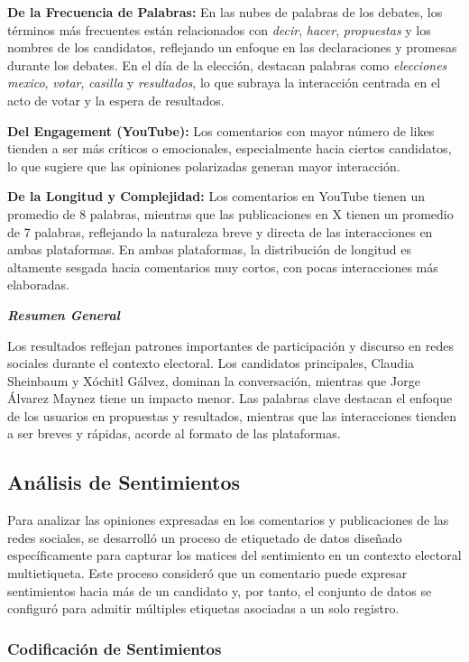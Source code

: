 \documentclass[10pt, a4paper]{article}
\begin{document}
	\textbf{De la Frecuencia de Palabras:} En las nubes de palabras de los debates, los términos más frecuentes están relacionados con \textit{decir}, \textit{hacer}, \textit{propuestas} y los nombres de los candidatos, reflejando un enfoque en las declaraciones y promesas durante los debates. En el día de la elección, destacan palabras como \textit{elecciones mexico}, \textit{votar}, \textit{casilla} y \textit{resultados}, lo que subraya la interacción centrada en el acto de votar y la espera de resultados.
	
	\textbf{Del Engagement (YouTube):} Los comentarios con mayor número de likes tienden a ser más críticos o emocionales, especialmente hacia ciertos candidatos, lo que sugiere que las opiniones polarizadas generan mayor interacción.
	
	\textbf{De la Longitud y Complejidad:} Los comentarios en YouTube tienen un promedio de 8 palabras, mientras que las publicaciones en X tienen un promedio de 7 palabras, reflejando la naturaleza breve y directa de las interacciones en ambas plataformas. En ambas plataformas, la distribución de longitud es altamente sesgada hacia comentarios muy cortos, con pocas interacciones más elaboradas.
	
	\textbf{\textit{Resumen General}}
	
	Los resultados reflejan patrones importantes de participación y discurso en redes sociales durante el contexto electoral. Los candidatos principales, Claudia Sheinbaum y Xóchitl Gálvez, dominan la conversación, mientras que Jorge Álvarez Maynez tiene un impacto menor. Las palabras clave destacan el enfoque de los usuarios en propuestas y resultados, mientras que las interacciones tienden a ser breves y rápidas, acorde al formato de las plataformas.
	
	\subsection{Análisis de Sentimientos}
	Para analizar las opiniones expresadas en los comentarios y publicaciones de las redes sociales, se desarrolló un proceso de etiquetado de datos diseñado específicamente para capturar los matices del sentimiento en un contexto electoral multietiqueta. Este proceso consideró que un comentario puede expresar sentimientos hacia más de un candidato y, por tanto, el conjunto de datos se configuró para admitir múltiples etiquetas asociadas a un solo registro.
	
	\subsubsection{Codificación de Sentimientos}
	
\end{document}
